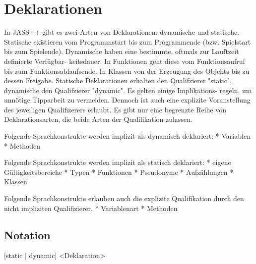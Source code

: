 \chapter { Deklarationen }

In JASS++ gibt es zwei Arten von Deklarationen: dynamische und statische. Statische existieren vom Programmstart bis zum
Programmende (bzw. Spielstart bis zum Spielende). Dynamische haben eine bestimmte, oftmals zur Lauftzeit definierte Verfügbar-
keitsdauer.
In Funktionen geht diese vom Funktionsaufruf bis zum Funktionsablaufsende. In Klassen von der Erzeugung des Objekts bis zu
dessen Freigabe.
Statische Deklarationen erhalten den Qualifzierer "static", dynamische den Qualifzierer "dynamic". Es gelten einige Implikations-
regeln, um unnötige Tipparbeit zu vermeiden. Dennoch ist auch eine explizite Voranstellung des jeweiligen Qualifizerers erlaubt.
Es gibt nur eine begrenzte Reihe von Deklarationsarten, die beide Arten der Qualifikation zulassen.

Folgende Sprachkonstrukte werden implizit als dynamisch deklariert:
* Variablen
* Methoden

Folgende Sprachkonstrukte werden implizit als statisch deklariert:
* eigene Gültigkeitsbereiche
* Typen
* Funktionen
* Pseudonyme
* Aufzählungen
* Klassen

Folgende Sprachkonstrukte erlauben auch die explizite Qualifikation durch den nicht impliziten Qualifizierer.
* Variablenart
* Methoden

\section { Notation }
[static | dynamic] <Deklaration> 
